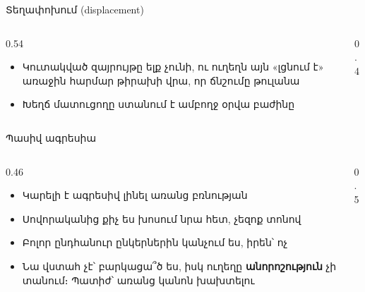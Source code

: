 \begin{frame}{Տեղափոխում (displacement)}
  \begin{columns}[c]
    \begin{column}{0.54\textwidth}
      \begin{itemize}
        \item Կուտակված զայրույթը ելք չունի, ու ուղեղն այն «լցնում է» առաջին հարմար թիրախի վրա, որ ճնշումը թուլանա
        \item Խեղճ մատուցողը ստանում է ամբողջ օրվա բաժինը
      \end{itemize}
      \vspace{1mm}
    \end{column}
    \begin{column}{0.4\textwidth}
      \centering{}
    \end{column}
  \end{columns}
\end{frame}

\begin{frame}{Պասիվ ագրեսիա}
  \begin{columns}[c]
    \begin{column}{0.46\textwidth}
      \begin{itemize}
        \item Կարելի է ագրեսիվ լինել առանց բռնության
        \item Սովորականից քիչ ես խոսում նրա հետ, չեզոք տոնով
        \item<2-> Բոլոր ընդհանուր ընկերներին կանչում ես, իրեն՝ ոչ
        \item<3-> Նա վստահ չէ՝ բարկացա՞ծ ես, իսկ ուղեղը \textbf{անորոշություն} չի տանում։ Պատիժ՝ առանց կանոն խախտելու
      \end{itemize}
    \end{column}
    \begin{column}{0.5\textwidth}
      \centering
    \end{column}
  \end{columns}
\end{frame}

